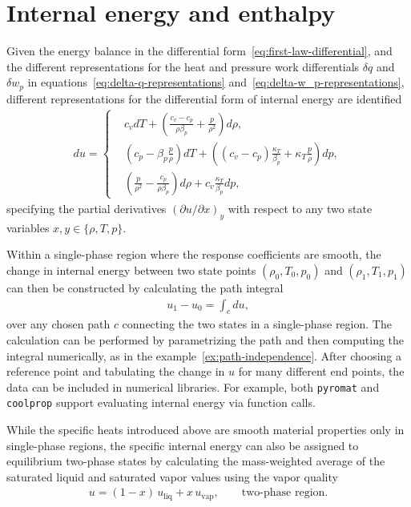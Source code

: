 \section{Internal energy and enthalpy}
Given the energy balance in the differential form~\eqref{eq:first-law-differential}, and the different representations for the heat and pressure work differentials $\delta q$ and $\delta w_p$ in equations~\eqref{eq:delta-q-representations} and~\eqref{eq:delta-w_p-representations}, different representations for the differential form of internal energy are identified
\begin{align}\label{eq:du-preliminary-representations}
    du=\left\{\begin{aligned}&c_vdT+\left(\frac{c_v-c_p}{\rho\beta_p}+\frac{p}{\rho^2}\right)d\rho,\\
    &\left(c_p-\beta_p\frac{p}{\rho}\right)dT+\left((c_v-c_p)\frac{\kappa_T}{\beta_p}+\kappa_T\frac{p}{\rho}\right)dp,\\
    &\left(\frac{p}{\rho^2}-\frac{c_p}{\rho\beta_p}\right)d\rho+c_v\frac{\kappa_T}{\beta_p}dp,\end{aligned}\right.
\end{align}
specifying the partial derivatives $(\partial u/\partial x)_{y}$ with respect to any two state variables $x,y\in\{\rho,T,p\}$. 

Within a single-phase region where the response coefficients are smooth, the change in internal energy between two state points $(\rho_0,T_0,p_0)$ and
$(\rho_1,T_1,p_1)$ can then be constructed by calculating the path integral
\begin{align}
    u_1-u_0=\int_c du,
\end{align}
over any chosen path $c$ connecting the two states in a single-phase region. The calculation can be performed by parametrizing the path and then computing the integral numerically, as in the example~\ref{ex:path-independence}. After choosing a reference point and tabulating the change in $u$ for many different end points, the data can be included in numerical libraries. For example, both \verb|pyromat| and \verb|coolprop| support evaluating internal energy via function calls. 

While the specific heats introduced above are smooth material properties only in single-phase regions, the specific internal energy can also be assigned to equilibrium two-phase states by calculating the mass-weighted average of the saturated liquid and saturated vapor values using the vapor quality
\begin{align}
    u=(1-x)\,u_\text{liq}+x\,u_\text{vap},\qquad \text{two-phase region}.
\end{align}

